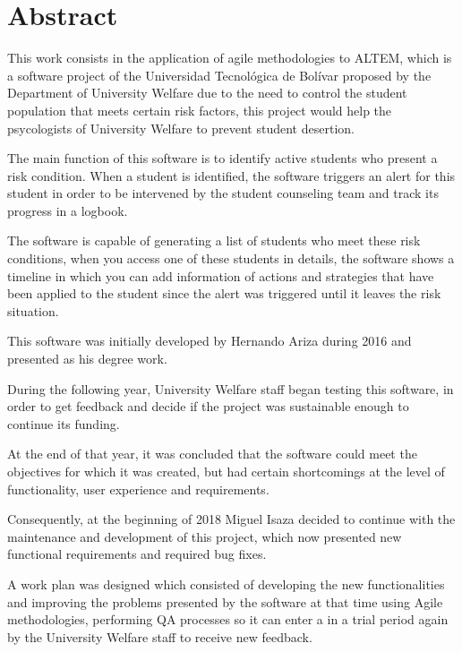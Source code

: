\chapter{Abstract}

This work consists in the application of agile methodologies to ALTEM, which is a software project of the Universidad Tecnológica de Bolívar proposed by the Department of University Welfare due to the need to control the student population that meets certain risk factors, this project would help the psycologists of University Welfare to prevent student desertion.

The main function of this software is to identify active students who present a risk condition. When a student is identified, the software triggers an alert for this student in order to be intervened by the student counseling team and track its progress in a logbook. 

The software is capable of generating a list of students who meet these risk conditions, when you access one of these students in details, the software shows a timeline in which you can add information of actions and strategies that have been applied to the student since the alert was triggered until it leaves the risk situation. 

This software was initially developed by Hernando Ariza during 2016 and presented as his degree work. 

During the following year, University Welfare staff began testing this software, in order to get feedback and decide if the project was sustainable enough to continue its funding. 

At the end of that year, it was concluded that the software could meet the objectives for which it was created, but had certain shortcomings at the level of functionality, user experience and requirements.

Consequently, at the beginning of 2018 Miguel Isaza decided to continue with the maintenance and development of this project, which now presented new functional requirements and required bug fixes.

A work plan was designed which consisted of developing the new functionalities and improving the problems presented by the software at that time using Agile methodologies, performing QA processes so it can enter a in a trial period again by the University Welfare staff to receive new feedback. 